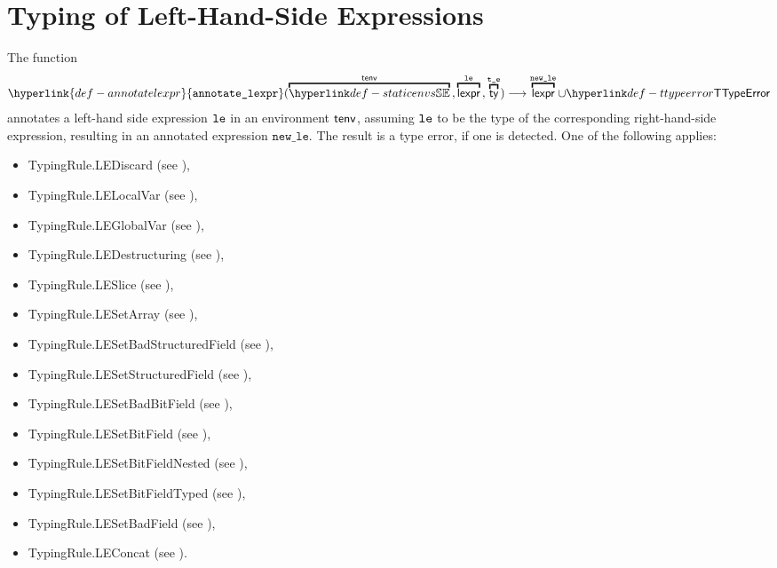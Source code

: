 \documentclass{book}
\newcommand\annotatelexpr[1]{\hyperlink{def-annotatelexpr}{\texttt{annotate\_lexpr}}(#1)}
\newcommand\vte[0]{\texttt{t\_e}}
\newcommand\newle[0]{\texttt{new\_le}}
\begin{document}
\chapter{Typing of Left-Hand-Side Expressions}
\hypertarget{def-annotatelexpr}{}
The function
\[
  \annotatelexpr{
    \overname{\staticenvs}{\tenv} \aslsep
    \overname{\lexpr}{\vle} \aslsep
    \overname{\ty}{\vte}} \aslto
    \overname{\lexpr}{\newle} \cup \TTypeError
\]
annotates a left-hand side expression $\texttt{le}$ in an environment $\textsf{tenv}$, assuming $\texttt{le}$
to be the type of the corresponding right-hand-side expression,
resulting in an annotated expression $\newle$.
The result is a type error, if one is detected.
One of the following applies:
\begin{itemize}
\item TypingRule.LEDiscard (see ),
\item TypingRule.LELocalVar (see ),
\item TypingRule.LEGlobalVar (see ),
\item TypingRule.LEDestructuring (see ),
\item TypingRule.LESlice (see ),
\item TypingRule.LESetArray (see ),
\item TypingRule.LESetBadStructuredField (see ),
\item TypingRule.LESetStructuredField (see ),
\item TypingRule.LESetBadBitField (see ),
\item TypingRule.LESetBitField (see ),
\item TypingRule.LESetBitFieldNested (see ),
\item TypingRule.LESetBitFieldTyped (see ),
\item TypingRule.LESetBadField (see ),
\item TypingRule.LEConcat (see ).
\end{itemize}
\end{document}
